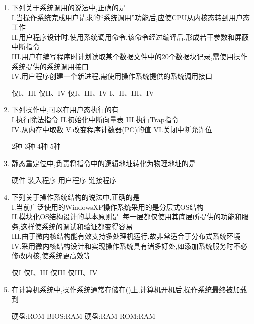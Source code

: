 \documentclass[12pt, a4paper, oneside, UTF8]{ctexbook}
\begin{document}
\begin{enumerate}
    \item 下列关于系统调用的说法中,正确的是\\
    I.当操作系统完成用户请求的“系统调用”功能后,应使CPU从内核态转到用户态工作\\
    II.用户程序设计时,使用系统调用命令,该命令经过编译后,形成若干参数和屏蔽中断指令\\
    III.用户在编写程序时计划读取某个数据文件中的20个数据块记录,需使用操作系统提供的系统调用接口\\
    IV.用户程序创建一个新进程,需使用操作系统提供的系统调用接口
    \begin{choices}[2]
    \task 仅I、III
    \task 仅II、IV
    \task 仅I、III、IV
    \task I、II、III、IV
    \end{choices}

    \item 下列操作中,可以在用户态执行的有\\
    I.执行除法指令\quad
    II.初始化中断向量表\quad
    III.执行Trap指令\\ 
    IV.从内存中取数\quad
    V.改变程序计数器(PC)的值\quad
    VI.关闭中断允许位
    \begin{choices}
    \task 2种
    \task 3种
    \task 4种
    \task 5种
    \end{choices}

    \item 静态重定位中,负责将指令中的逻辑地址转化为物理地址的是
    \begin{choices}
    \task 硬件
    \task 装入程序
    \task 用户程序
    \task 链接程序
    \end{choices}

    \item 下列关于操作系统结构的说法中,正确的是\\
    I.当前广泛使用的WindowsXP操作系统采用的是分层式OS结构\\
    II.模块化OS结构设计的基本原则是\ 每一层都仅使用其底层所提供的功能和服务,这样使系统的调试和验证都变得容易\\
    III.由于微内核结构能有效支持多处理机运行,故非常适合于分布式系统环境\\
    IV.采用微内核结构设计和实现操作系统具有诸多好处,如添加系统服务时不必修改内核,使系统更高效等
    \begin{choices}
    \task 仅I
    \task 仅I、III
    \task 仅III
    \task 仅III、IV
    \end{choices}

    \item 在计算机系统中,操作系统通常存储在()上,计算机开机后,操作系统最终被加载到
    \begin{choices}
    \task 硬盘:ROM
    \task BIOS:RAM
    \task 硬盘:RAM
    \task ROM:RAM
    \end{choices}


\end{enumerate}
\end{document}
